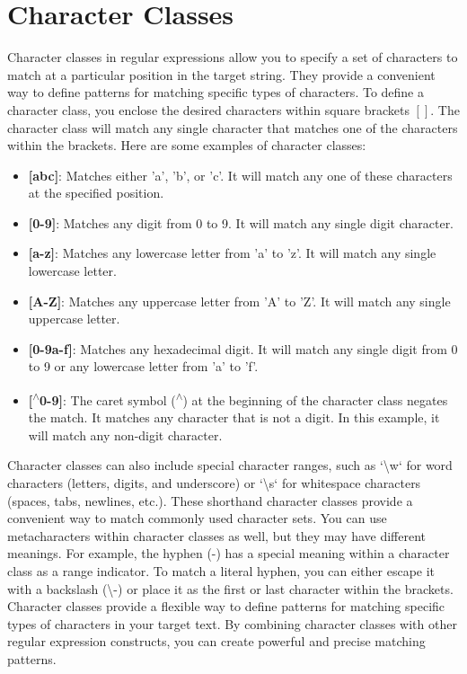 \documentclass{report}
\begin{document}
    \section{Character Classes}
    Character classes in regular expressions allow you to specify a set of characters to match at a particular position in the target string. They provide a convenient way to define patterns for matching specific types of characters.
    \bigbreak \noindent 
    To define a character class, you enclose the desired characters within square brackets \([ ]\). The character class will match any single character that matches one of the characters within the brackets.
    \bigbreak \noindent 
    Here are some examples of character classes:
    \begin{itemize}
        \item \textbf{[abc]}: Matches either 'a', 'b', or 'c'. It will match any one of these characters at the specified position.
        \item \textbf{[0-9]}: Matches any digit from 0 to 9. It will match any single digit character.
        \item \textbf{[a-z]}: Matches any lowercase letter from 'a' to 'z'. It will match any single lowercase letter.
        \item \textbf{[A-Z]}: Matches any uppercase letter from 'A' to 'Z'. It will match any single uppercase letter.
        \item \textbf{[0-9a-f]}: Matches any hexadecimal digit. It will match any single digit from 0 to 9 or any lowercase letter from 'a' to 'f'.
        \item \textbf{[\textsuperscript{$\wedge$}0-9]}: The caret symbol (\textsuperscript{$\wedge$}) at the beginning of the character class negates the match. It matches any character that is not a digit. In this example, it will match any non-digit character.
    \end{itemize}
    Character classes can also include special character ranges, such as `\textbackslash w` for word characters (letters, digits, and underscore) or `\textbackslash s` for whitespace characters (spaces, tabs, newlines, etc.). These shorthand character classes provide a convenient way to match commonly used character sets.
    \bigbreak \noindent 
    You can use metacharacters within character classes as well, but they may have different meanings. For example, the hyphen (-) has a special meaning within a character class as a range indicator. To match a literal hyphen, you can either escape it with a backslash (\textbackslash -) or place it as the first or last character within the brackets.
    \bigbreak \noindent 
    Character classes provide a flexible way to define patterns for matching specific types of characters in your target text. By combining character classes with other regular expression constructs, you can create powerful and precise matching patterns.
\end{document}
